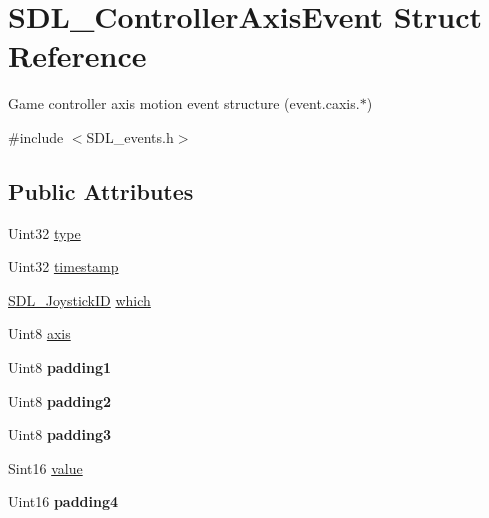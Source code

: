 \hypertarget{structSDL__ControllerAxisEvent}{}\section{S\+D\+L\+\_\+\+Controller\+Axis\+Event Struct Reference}
\label{structSDL__ControllerAxisEvent}


Game controller axis motion event structure (event.\+caxis.$\ast$)  




{\ttfamily \#include $<$S\+D\+L\+\_\+events.\+h$>$}

\subsection*{Public Attributes}
\begin{DoxyCompactItemize}
\item 
Uint32 \hyperlink{structSDL__ControllerAxisEvent_aa904b61e4763d28d887cf8afcc3cbb7c}{type}
\item 
Uint32 \hyperlink{structSDL__ControllerAxisEvent_afc92dba0b4d1652a1ecf9e85606d1f14}{timestamp}
\item 
\hyperlink{SDL__joystick_8h_a3c3d32500cb08f76ee8077983912c0bd}{S\+D\+L\+\_\+\+Joystick\+ID} \hyperlink{structSDL__ControllerAxisEvent_a07087f68ea9d64b50047d65312ee7b94}{which}
\item 
Uint8 \hyperlink{structSDL__ControllerAxisEvent_aba6543c143521aebce06a41a8cf79db0}{axis}
\item 
\mbox{\label{structSDL__ControllerAxisEvent_af980495b1e24f9a868f2ccb25ce9629b}} 
Uint8 {\bfseries padding1}
\item 
\mbox{\label{structSDL__ControllerAxisEvent_a4a04fcd20a54db21c5258ab0e40c6ab5}} 
Uint8 {\bfseries padding2}
\item 
\mbox{\label{structSDL__ControllerAxisEvent_ab82598fe5621dca9b1a41f7b2ca1e9a0}} 
Uint8 {\bfseries padding3}
\item 
Sint16 \hyperlink{structSDL__ControllerAxisEvent_a1ed7f14255ed01b982d40a38791d475a}{value}
\item 
\mbox{\label{structSDL__ControllerAxisEvent_ae0ad0f279b9978bbbac9f5b22ae8020b}} 
Uint16 {\bfseries padding4}
\end{DoxyCompactItemize}


